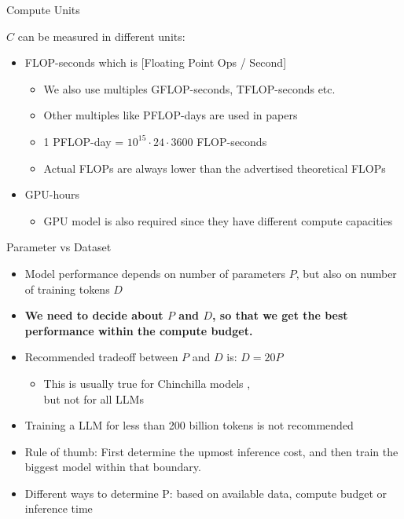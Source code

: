 
\begin{vbframe}{Compute Units}

\vfill

$C$  can be measured in different units:\newline

\begin{itemize}
    \item FLOP-seconds which is [Floating Point Ops / Second]
	\begin{itemize}
	    \item We also use multiples GFLOP-seconds, TFLOP-seconds etc.
		\item Other multiples like PFLOP-days are used in papers
		\item 1 PFLOP-day = $10^{15} \cdot 24 \cdot 3600$ FLOP-seconds
		\item Actual FLOPs are always lower than the advertised theoretical FLOPs
	\end{itemize}
	\item GPU-hours
	\begin{itemize}
	    \item GPU model is also required since they have different compute capacities
	\end{itemize}
\end{itemize}

\vfill

\end{vbframe}


\begin{vbframe}{Parameter vs Dataset}

\vfill

\begin{itemize}
    \item Model performance depends on number of parameters $P$, but also on number of training tokens $D$
	\item \textbf{We need to decide about $P$ and $D$, so that we get the best performance within the compute budget.}
	\item
        Recommended tradeoff between $P$ and $D$ is: $D = 20 P$
	\begin{itemize}
	    \item This is usually true for Chinchilla models ,\\but not for all LLMs
	\end{itemize}
	\item Training a LLM for less than 200 billion tokens is not recommended
	\item Rule of thumb: First determine the upmost
	inference cost, and then train the biggest model
	within that boundary.
        \item Different ways to determine P: based
	on available data, compute budget or
	inference time
\end{itemize}

\vfill

\end{vbframe}

